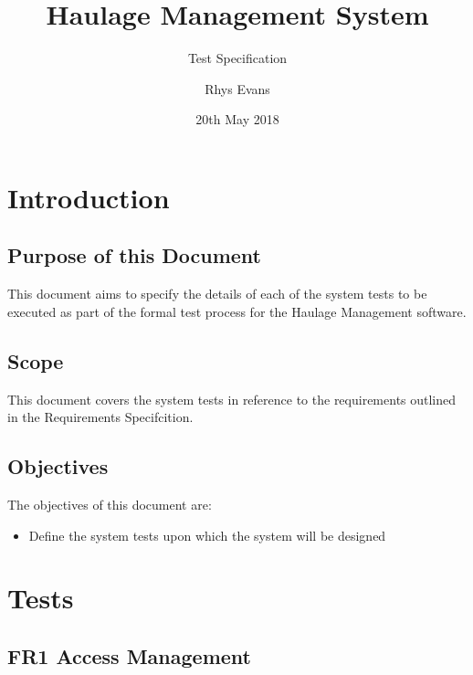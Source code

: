 \documentclass{project}
\begin{document}
\title{Haulage Management System}
\subtitle{Test Specification}
\author{Rhys Evans}     
\date{20th May 2018}
\maketitle
\tableofcontents
\newpage

\section{Introduction}
\subsection{Purpose of this Document}
This document aims to specify the details of each of the system tests to be executed as part of the formal test process for the Haulage Management software.

\subsection{Scope}
This document covers the system tests in reference to the requirements outlined in the Requirements Specifcition\cite{HM-QA-RS}.

\subsection{Objectives}
The objectives of this document are:

\begin{itemize}
	\item Define the system tests upon which the system will be designed
\end{itemize}

\newpage

\section{Tests}

\subsection{FR1 Access Management}
\end{document}
